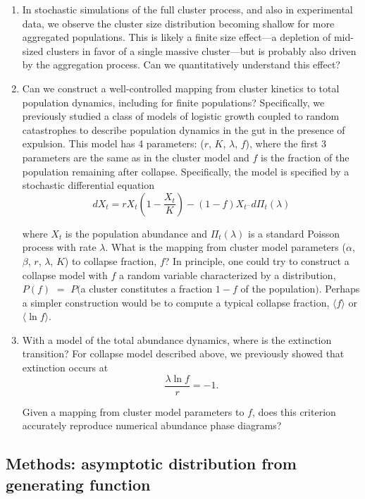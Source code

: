 \documentclass[12pt]{article}
\def\be{\begin{equation}}
\def\ee{\end{equation}}
\begin{document}
\begin{enumerate}
	\item 
	In stochastic simulations of the full cluster process, and also in experimental data, we observe the cluster size distribution becoming shallow for more aggregated populations. This is likely a finite size effect---a depletion of mid-sized clusters in favor of a single massive cluster---but is probably also driven by the aggregation process. Can we quantitatively understand this effect?
	\item 
	Can we construct a well-controlled mapping from cluster kinetics to total population dynamics, including for finite populations? Specifically, we previously studied a class of models of logistic growth coupled to random catastrophes to describe population dynamics in the gut in the presence of expulsion. This model has 4 parameters: ($r$, $K$, $\lambda$, $f$), where the first 3 parameters are the same as in the cluster model and $f$ is the fraction of the population remaining after collapse. Specifically, the model is specified by a stochastic differential equation 
	\be
		dX_t = rX_t\left(1-\frac{X_t}{K}\right) - (1-f)X_{t^{-}}d\Pi_t(\lambda)
	\ee
	
	\noindent where $X_t$ is the population abundance and $\Pi_t(\lambda)$ is a standard Poisson process with rate $\lambda$. What is the mapping from cluster model parameters ($\alpha$, $\beta$, $r$, $\lambda$, $K$) to collapse fraction, $f$? In principle, one could try to construct a collapse model with $f$ a random variable characterized by a distribution, $P(f)$ $=$ $P($a cluster constitutes a fraction $1-f$ of the population$)$. Perhaps a simpler construction would be to compute a typical collapse fraction, $\langle f \rangle$ or $\langle \ln f \rangle$. 
	
	\item 
	With a model of the total abundance dynamics, where is the extinction transition? For collapse model described above, we previously showed that extinction occurs at
	\be
		\frac{\lambda\ln f}{r} = -1.
	\ee
	
	\noindent Given a mapping from cluster model parameters to $f$, does this criterion accurately reproduce numerical abundance phase diagrams?
	
\end{enumerate}

\subsection*{Methods: asymptotic distribution from generating function}
\end{document}
